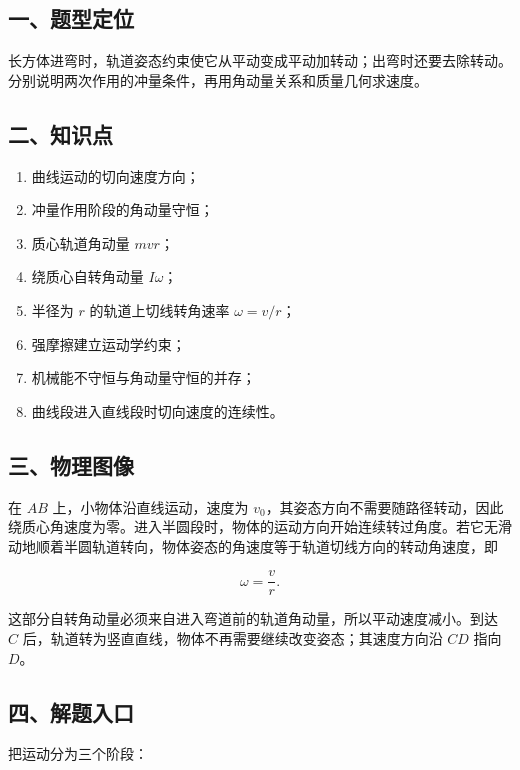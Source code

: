 \documentclass[12pt,a4paper,UTF8]{ctexart}
\newcommand{\tightlist}{\setlength{\itemsep}{0pt}\setlength{\parskip}{0pt}}
\begin{document}
\subsection{一、题型定位}\label{ux4e00ux9898ux578bux5b9aux4f4d-7}

长方体进弯时，轨道姿态约束使它从平动变成平动加转动；出弯时还要去除转动。分别说明两次作用的冲量条件，再用角动量关系和质量几何求速度。

\subsection{二、知识点}\label{ux4e8cux77e5ux8bc6ux70b9-7}

\begin{enumerate}
\def\labelenumi{\arabic{enumi}.}
\tightlist
\item
  曲线运动的切向速度方向；
\item
  冲量作用阶段的角动量守恒；
\item
  质心轨道角动量 \(mvr\)；
\item
  绕质心自转角动量 \(I\omega\)；
\item
  半径为 \(r\) 的轨道上切线转角速率 \(\omega=v/r\)；
\item
  强摩擦建立运动学约束；
\item
  机械能不守恒与角动量守恒的并存；
\item
  曲线段进入直线段时切向速度的连续性。
\end{enumerate}

\subsection{三、物理图像}\label{ux4e09ux7269ux7406ux56feux50cf-7}

在 \(AB\) 上，小物体沿直线运动，速度为
\(v_0\)，其姿态方向不需要随路径转动，因此绕质心角速度为零。进入半圆段时，物体的运动方向开始连续转过角度。若它无滑动地顺着半圆轨道转向，物体姿态的角速度等于轨道切线方向的转动角速度，即

\[
\omega=\frac vr.
\]

这部分自转角动量必须来自进入弯道前的轨道角动量，所以平动速度减小。到达
\(C\) 后，轨道转为竖直直线，物体不再需要继续改变姿态；其速度方向沿
\(CD\) 指向 \(D\)。

\subsection{四、解题入口}\label{ux56dbux89e3ux9898ux5165ux53e3-7}

把运动分为三个阶段：
\end{document}
